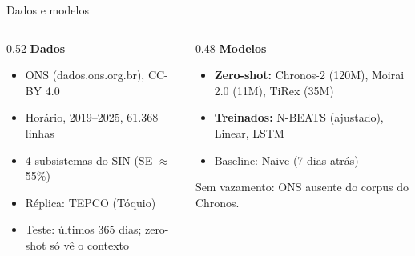 \documentclass[aspectratio=169,10pt]{beamer}
\newcommand{\hl}[1]{\textcolor{hl}{\textbf{#1}}}
\begin{document}
\begin{frame}{Dados e modelos}
  \begin{columns}[T]
    \begin{column}{0.52\textwidth}
      \textbf{Dados}
      \begin{itemize}
        \item ONS (dados.ons.org.br), CC-BY 4.0
        \item Horário, 2019--2025, 61.368 linhas
        \item 4 subsistemas do SIN (SE $\approx$ 55\%)
        \item Réplica: TEPCO (Tóquio)
        \item Teste: últimos 365 dias; zero-shot só vê o contexto
      \end{itemize}
    \end{column}
    \begin{column}{0.48\textwidth}
      \textbf{Modelos}
      \begin{itemize}
        \item \hl{Zero-shot:} Chronos-2 (120M), Moirai 2.0 (11M), TiRex (35M)
        \item \hl{Treinados:} N-BEATS (ajustado), Linear, LSTM
        \item Baseline: Naive (7 dias atrás)
      \end{itemize}
      \vspace{0.5em}
      \footnotesize Sem vazamento: ONS ausente do corpus do Chronos.
    \end{column}
  \end{columns}
\end{frame}
\end{document}
